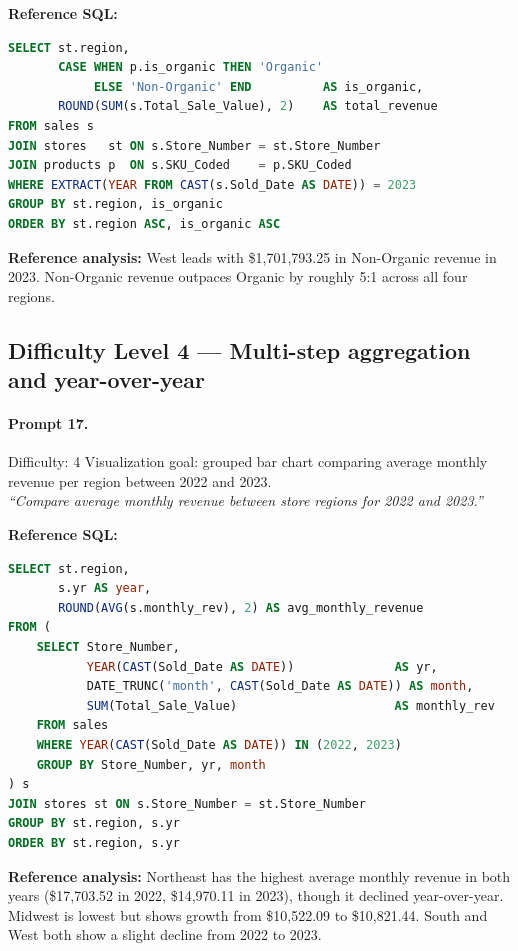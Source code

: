 \textbf{Reference SQL:}
\begin{lstlisting}[language=SQL]
SELECT st.region,
       CASE WHEN p.is_organic THEN 'Organic'
            ELSE 'Non-Organic' END          AS is_organic,
       ROUND(SUM(s.Total_Sale_Value), 2)    AS total_revenue
FROM sales s
JOIN stores   st ON s.Store_Number = st.Store_Number
JOIN products p  ON s.SKU_Coded    = p.SKU_Coded
WHERE EXTRACT(YEAR FROM CAST(s.Sold_Date AS DATE)) = 2023
GROUP BY st.region, is_organic
ORDER BY st.region ASC, is_organic ASC
\end{lstlisting}

\textbf{Reference analysis:}
West leads with \$1,701,793.25 in Non-Organic revenue in 2023. Non-Organic
revenue outpaces Organic by roughly 5:1 across all four regions.

\subsection*{Difficulty Level 4 — Multi-step aggregation and year-over-year}

\paragraph{Prompt 17.}
Difficulty: 4 \quad Visualization goal: grouped bar chart comparing average monthly revenue per region between 2022 and 2023.\\[2pt]
\textit{``Compare average monthly revenue between store regions for 2022 and 2023.''}

\textbf{Reference SQL:}
\begin{lstlisting}[language=SQL]
SELECT st.region,
       s.yr AS year,
       ROUND(AVG(s.monthly_rev), 2) AS avg_monthly_revenue
FROM (
    SELECT Store_Number,
           YEAR(CAST(Sold_Date AS DATE))              AS yr,
           DATE_TRUNC('month', CAST(Sold_Date AS DATE)) AS month,
           SUM(Total_Sale_Value)                      AS monthly_rev
    FROM sales
    WHERE YEAR(CAST(Sold_Date AS DATE)) IN (2022, 2023)
    GROUP BY Store_Number, yr, month
) s
JOIN stores st ON s.Store_Number = st.Store_Number
GROUP BY st.region, s.yr
ORDER BY st.region, s.yr
\end{lstlisting}

\textbf{Reference analysis:}
Northeast has the highest average monthly revenue in both years (\$17,703.52 in
2022, \$14,970.11 in 2023), though it declined year-over-year. Midwest is lowest
but shows growth from \$10,522.09 to \$10,821.44. South and West both show a
slight decline from 2022 to 2023.


